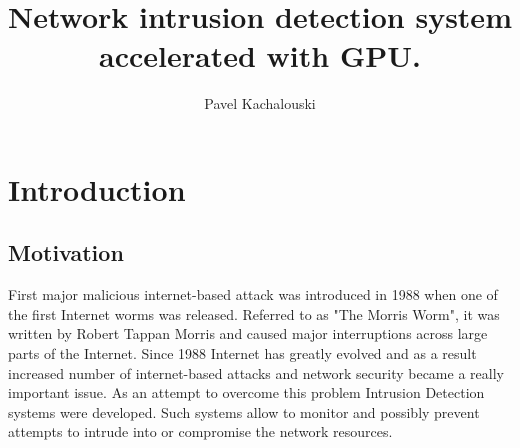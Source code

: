 \documentclass[thesis=M,english]{FITthesis}[2011/07/15]
\title{Network intrusion detection system\\ accelerated with GPU.}
\author{Pavel Kachalouski} %
\begin{document}

\chapter{Introduction}
\label{chap:introduction}
\section{Motivation}
First major malicious internet-based attack was introduced in 1988 when one of the first Internet worms was released. Referred to as "The Morris Worm", it was written by Robert Tappan Morris and caused major interruptions across large parts of the Internet. Since 1988 Internet has greatly evolved and as a result increased number of internet-based attacks and network security became a really important issue. As an attempt to overcome this problem Intrusion Detection systems were developed. Such systems allow to monitor and possibly prevent attempts to intrude into or compromise the network resources.
\end{document}
